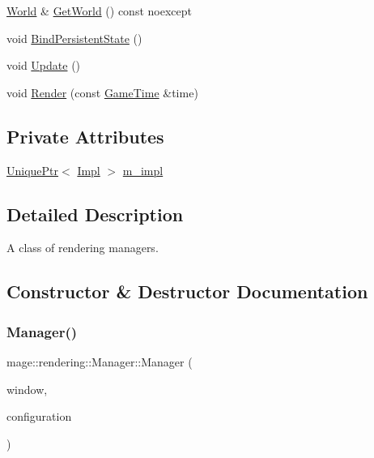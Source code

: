 \begin{DoxyCompactItemize}
\item 
\hyperlink{classmage_1_1rendering_1_1_world}{World} \& \hyperlink{classmage_1_1rendering_1_1_manager_a526b7c2db1a219e9b3bd4286e039696d}{Get\+World} () const noexcept
\item 
void \hyperlink{classmage_1_1rendering_1_1_manager_ac46b7739c7005b5a7248642ffc8299d7}{Bind\+Persistent\+State} ()
\item 
void \hyperlink{classmage_1_1rendering_1_1_manager_a878849c66920ccef910b31c80b1f033c}{Update} ()
\item 
void \hyperlink{classmage_1_1rendering_1_1_manager_af6807d464e6496c342a9cf451e70d141}{Render} (const \hyperlink{classmage_1_1_game_time}{Game\+Time} \&time)
\end{DoxyCompactItemize}
\subsection*{Private Attributes}
\begin{DoxyCompactItemize}
\item 
\hyperlink{namespacemage_a3316d7143a973e37adf1110f2e80ca31}{Unique\+Ptr}$<$ \hyperlink{classmage_1_1rendering_1_1_manager_1_1_impl}{Impl} $>$ \hyperlink{classmage_1_1rendering_1_1_manager_a1fa26fd6393941f4ef9b6863f317cd29}{m\+\_\+impl}
\end{DoxyCompactItemize}


\subsection{Detailed Description}
A class of rendering managers. 

\subsection{Constructor \& Destructor Documentation}
\hypertarget{classmage_1_1rendering_1_1_manager_acf71efbc73317b319be41682505695f1}{}\label{classmage_1_1rendering_1_1_manager_acf71efbc73317b319be41682505695f1} 
\subsubsection{\texorpdfstring{Manager()}{Manager()}\hspace{0.1cm}{\footnotesize\ttfamily [1/3]}}
{\footnotesize\ttfamily mage\+::rendering\+::\+Manager\+::\+Manager (\begin{DoxyParamCaption}\item[{\hyperlink{namespacemage_a8769f9d670d6b585ea306cb1062af94b}{Not\+Null}$<$ H\+W\+ND $>$}]{window,  }\item[{\hyperlink{classmage_1_1rendering_1_1_display_configuration}{Display\+Configuration}}]{configuration }\end{DoxyParamCaption})\hspace{0.3cm}{\ttfamily [explicit]}}

